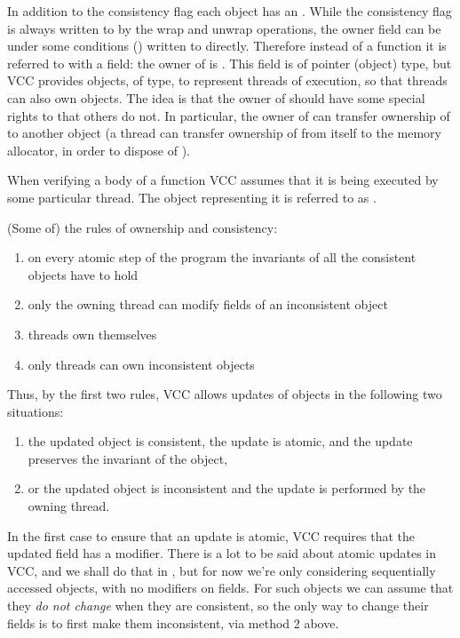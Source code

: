 In addition to the consistency flag each object has an .
While the consistency flag is always written to by the wrap
and unwrap operations, the owner field can be under some
conditions () written to directly.
Therefore instead of a function it is referred to with
a field: the owner of  is .
This field is of pointer (object) type, but
VCC provides objects, of \vcc{\thread}
type, to represent threads of execution, so that threads can also own objects.
The idea is that the owner of  should have some special rights to  that others do not.
In particular, the owner of  can transfer ownership of  to
another object (\eg a thread can transfer ownership of  from itself to the memory allocator, 
in order to dispose of ).

When verifying a body of a function VCC assumes that it is being executed by some
particular thread.
The \vcc{\thread} object representing it is referred to as \vcc{\me}.

(Some of) the rules of ownership and consistency:
\begin{enumerate}
\item on every atomic step of the program the invariants of all the consistent objects have to hold
\item only the owning thread can modify fields of an inconsistent object
\item threads own themselves
\item only threads can own inconsistent objects
\end{enumerate}
Thus, by the first two rules, VCC allows updates of objects in the following two situations:
\begin{enumerate}
\item the updated object is consistent, the update is atomic, and the update preserves the invariant of the object,
\item or the updated object is inconsistent and the update is performed by the owning thread.
\end{enumerate}
In the first case to ensure that an update is atomic, VCC requires that the
updated field has a  modifier.
There is a lot to be said about atomic updates in VCC, and we shall do
that in , but for now we're only considering sequentially
accessed objects, with no  modifiers on fields.
For such objects we can assume that they \emph{do not change}
when they are consistent, so the only way to change their fields is to
first make them inconsistent, \ie via method 2 above.

